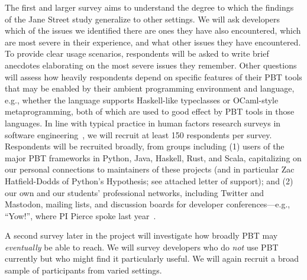 The first and larger survey
aims to understand the degree to which
the findings of the Jane Street study generalize to other settings.
We will
ask developers which of the issues we identified there are
ones they have also encountered, which are most severe
in their experience, and what
other issues they have encountered.
To provide
clear usage scenarios, respondents will
be asked to write brief anecdotes elaborating on the
most severe issues they remember.  Other questions will assess how
heavily respondents depend on specific features of their PBT tools
that may be enabled by their
ambient programming environment and language, e.g., whether the
language supports Haskell-like typeclasses or OCaml-style
metaprogramming, both of which are used to good effect by
PBT tools in those languages.
\iflater{} In line with typical practice in
human factors research surveys in software
engineering~\cite{ref:robillard2009makes,ref:uddin2015api,ref:murphyhill2019predicts},
we will recruit at least 150 respondents per survey.\fi{}
Respondents will
be recruited broadly, from groups including
(1)
users of the major PBT frameworks in Python, Java, Haskell, Rust, and
Scala, capitalizing on our personal connections to maintainers of
these projects (and in particular Zac Hatfield-Dodds of Python's Hypothesis; see attached letter of support); and
(2) our own and our students' professional networks, including
Twitter and Mastodon, mailing lists, and discussion boards for developer
conferences---e.g., ``Yow!'', where PI Pierce spoke last
year~\cite{Pierce:Yow22}.

A second survey later in the project will investigate
how broadly PBT may {\em eventually} be able to reach.  We will
survey developers who do {\em not} use PBT
currently but who might find it particularly useful.
We will again recruit a broad sample of participants from varied settings.


%

